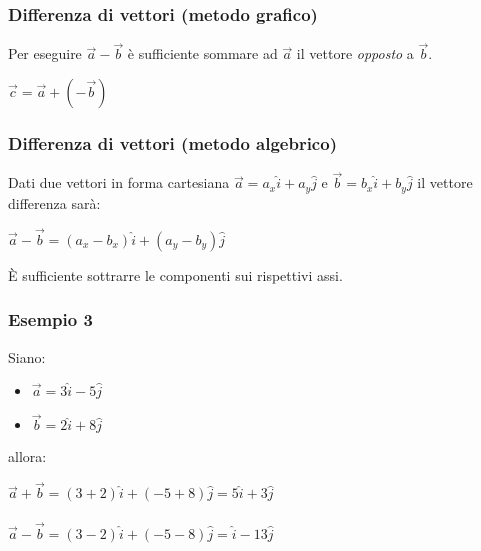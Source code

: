 \documentclass[]{beamer}
\begin{document}
\begin{frame}
  \frametitle{Differenza di vettori (metodo grafico)}
  Per eseguire $ \vec{a} - \vec{b} $ è sufficiente sommare ad $ \vec{a} $ il vettore \emph{opposto} a $ \vec{b} $.\pause
  
  
\begin{figure}
\end{figure}
\begin{center}
\colorbox{marroncino!30}{ $ \vec{c} = \vec{a} + (-\vec{b}) $ }
\end{center}
\end{frame}


\begin{frame}
  \frametitle{Differenza di vettori (metodo algebrico)}
  Dati due vettori in forma cartesiana $ \vec{a} = a_x \hat{i} + a_y \hat{j} $ e  $ \vec{b} = b_x \hat{i} + b_y \hat{j} $ il vettore differenza sarà: 
 \begin{center}
 \colorbox{marroncino!30}{ $  \vec{a} - \vec{b} =  (a_x - b_x) \hat{i} + (a_y - b_y) \hat{j} $ }
 \end{center}
 È sufficiente sottrarre le componenti sui rispettivi assi.
\end{frame}


\begin{frame}
  \frametitle{Esempio 3}


Siano:
\begin{itemize}
  \item $ \vec{a} = 3 \hat{i} - 5\hat{j} $
  \item $ \vec{b} = 2 \hat{i} + 8 \hat{j} $
\end{itemize}
allora:
\begin{center}
$ \vec{a} + \vec{b} = (3+2)\hat{i} + (-5+8)\hat{j} = 5\hat{i} + 3\hat{j} $\\~\\
$ \vec{a} - \vec{b} = (3-2)\hat{i} + (-5-8)\hat{j} = \hat{i} - 13\hat{j} $
\end{center}

\end{frame}
\end{document}

